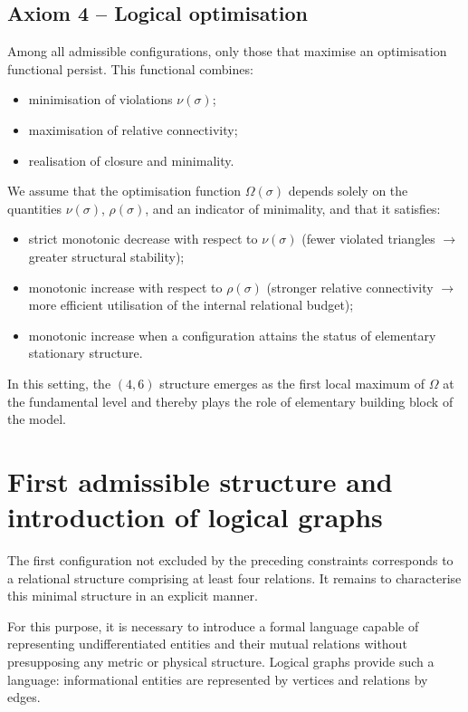 \documentclass[11pt,a4paper]{article}
\begin{document}
\subsection*{Axiom 4 – Logical optimisation}
Among all admissible configurations, only those that maximise an optimisation functional persist. This functional combines:
\begin{itemize}[label=-]
  \item minimisation of violations \(\nu(\sigma)\);
  \item maximisation of relative connectivity;
  \item realisation of closure and minimality.
\end{itemize}
We assume that the optimisation function \(\Omega(\sigma)\) depends solely on the quantities \(\nu(\sigma)\), \(\rho(\sigma)\), and an indicator of minimality, and that it satisfies:
\begin{itemize}[label=-]
  \item strict monotonic decrease with respect to \(\nu(\sigma)\) (fewer violated triangles \(\rightarrow\) greater structural stability);
  \item monotonic increase with respect to \(\rho(\sigma)\) (stronger relative connectivity \(\rightarrow\) more efficient utilisation of the internal relational budget);
  \item monotonic increase when a configuration attains the status of elementary stationary structure.
\end{itemize}
In this setting, the \((4,6)\) structure emerges as the first local maximum of \(\Omega\) at the fundamental level and thereby plays the role of elementary building block of the model.

\section{First admissible structure and introduction of logical graphs}

The first configuration not excluded by the preceding constraints corresponds to a relational structure comprising at least four relations. It remains to characterise this minimal structure in an explicit manner.

For this purpose, it is necessary to introduce a formal language capable of representing undifferentiated entities and their mutual relations without presupposing any metric or physical structure. Logical graphs provide such a language: informational entities are represented by vertices and relations by edges.
\end{document}
